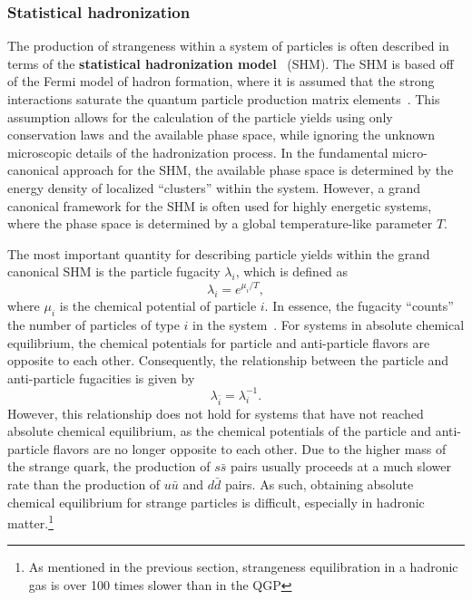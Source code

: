 \clearpage


\subsubsection{Statistical hadronization}
\label{sec:shm}

The production of strangeness within a system of particles is often described in terms of the \textbf{statistical hadronization model}~\cite{SHM} (SHM). The SHM is based off of the Fermi model of hadron formation, where it is assumed that the strong interactions saturate the quantum particle production matrix elements~\cite{RafelskiSHM}. This assumption allows for the calculation of the particle yields using only conservation laws and the available phase space, while ignoring the unknown microscopic details of the hadronization process. In the fundamental micro-canonical approach for the SHM, the available phase space is determined by the energy density of localized ``clusters'' within the system. However, a grand canonical framework for the SHM is often used for highly energetic systems, where the phase space is determined by a global temperature-like parameter $T$. 

The most important quantity for describing particle yields within the grand canonical SHM is the particle fugacity $\lambda_i$, which is defined as
%
\begin{equation}
    \label{eq:particle_fugacity}
    \lambda_i = e^{\mu_i/T},
\end{equation}
%
where $\mu_i$ is the chemical potential of particle $i$. In essence, the fugacity ``counts'' the number of particles of type $i$ in the system~\cite{Strangeness}. For systems in absolute chemical equilibrium, the chemical potentials for particle and anti-particle flavors are opposite to each other. Consequently, the relationship between the particle and anti-particle fugacities is given by
%
\begin{equation}
    \lambda_{\bar{i}} = \lambda_i^{-1}.
\end{equation}
%
However, this relationship does not hold for systems that have not reached absolute chemical equilibrium, as the chemical potentials of the particle and anti-particle flavors are no longer opposite to each other. Due to the higher mass of the strange quark, the production of $s\bar{s}$ pairs usually proceeds at a much slower rate than the production of $u\bar{u}$ and $d\bar{d}$ pairs. As such, obtaining absolute chemical equilibrium for strange particles is difficult, especially in hadronic matter.\footnote{As mentioned in the previous section, strangeness equilibration in a hadronic gas is over 100 times slower than in the QGP} 

